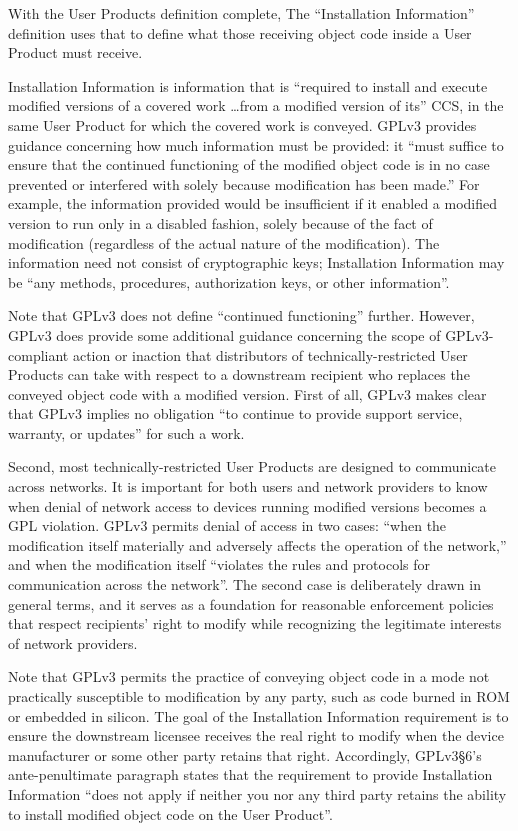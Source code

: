 With the User Products definition complete,  The ``Installation Information''
definition uses that to define what those receiving object code inside a User
Product must receive.

Installation Information is information that is ``required to install and
execute modified versions of a covered work \dots from a modified version of
its'' CCS, in the same User Product for which the covered work is conveyed.
GPLv3 provides guidance concerning how much information must be provided: it
``must suffice to ensure that the continued functioning of the modified
object code is in no case prevented or interfered with solely because
modification has been made.''  For example, the information provided would be
insufficient if it enabled a modified version to run only in a disabled
fashion, solely because of the fact of modification (regardless of the actual
nature of the modification).  The information need not consist of
cryptographic keys; Installation Information may be ``any methods,
procedures, authorization keys, or other information''.

Note that GPLv3 does not define ``continued functioning'' further.  However,
GPLv3 does provide some additional guidance concerning the scope of
GPLv3-compliant action or inaction that distributors of
technically-restricted User Products can take with respect to a downstream
recipient who replaces the conveyed object code with a modified version.
First of all, GPLv3 makes clear that GPLv3 implies no obligation ``to
continue to provide support service, warranty, or updates'' for such a work.

Second, most technically-restricted User Products are designed to communicate
across networks.  It is important for both users and network providers to
know when denial of network access to devices running modified versions
becomes a GPL violation.  GPLv3 permits denial of access in two cases: ``when
the modification itself materially and adversely affects the operation of the
network,'' and when the modification itself ``violates the rules and
protocols for communication across the network''.  The second case is
deliberately drawn in general terms, and it serves as a foundation for
reasonable enforcement policies that respect recipients' right to modify
while recognizing the legitimate interests of network providers.

Note that GPLv3 permits the practice of conveying object code in a mode not
practically susceptible to modification by any party, such as code burned in
ROM or embedded in silicon.  The goal of the Installation Information
requirement is to ensure the downstream licensee receives the real right to
modify when the device manufacturer or some other party retains that right.
Accordingly, GPLv3\S6's ante-penultimate paragraph states that the
requirement to provide Installation Information ``does not apply if neither
you nor any third party retains the ability to install modified object code
on the User Product''.

